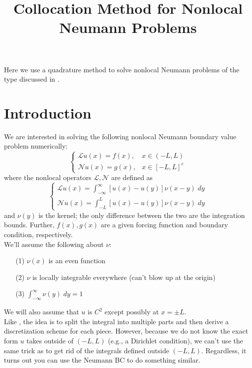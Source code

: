 \documentclass[pra,onecolumn,superscriptaddress,aps]{revtex4}
\begin{document}
\title{Collocation Method for Nonlocal Neumann Problems}


\maketitle
       
Here we use a quadrature method to solve nonlocal Neumann problems of the type discussed in \cite{Ros-Oton}. 

\section{Introduction}  
We are interested in solving the following nonlocal Neumann boundary value problem numerically:
\begin{equation}
\begin{cases}
\mathcal{L}u(x) = f(x), & x \in (-L, L) \\
\mathcal{N}u(x) = g(x), & x \in [-L,L]^c
\end{cases}
\end{equation}
where the nonlocal operators $\mathcal{L}, \mathcal{N}$ are defined as
\begin{equation} 
\begin{cases}
\mathcal{L}u(x) = \int^\infty_{-\infty} [u(x) - u(y)] \nu(x-y) \; dy\\[.2cm]
\mathcal{N}u(x) = \int^L_{-L} [u(x) - u(y)] \nu(x-y) \; dy 
\end{cases}
\label{eq2}
\end{equation}
and $\nu(y)$ is the kernel; the only difference between the two are the integration bounds. Further, $f(x), g(x)$ are a given forcing function and boundary condition, respectively. \\

We'll assume the following about $\nu$:
\begin{itemize}
\item[(1)] $\nu(x)$ is an even function
\item[(2)] $\nu$ is locally integrable everywhere (can't blow up at the origin)
\item[(3)] $\int^\infty_{-\infty} \nu(y) \; dy = 1$
\end{itemize}

We will also assume that $u$ is $C^2$ except possibly at $x = \pm L$.\\

Like \cite{Oberman}, the idea is to split the integral into multiple parts and then derive a discretization scheme for each piece. However, because we do not know the exact form $u$ takes outside of $(-L,L)$ (e.g., a Dirichlet condition), we can't use the same trick as \cite{Oberman} to get rid of the integrals defined outside $(-L,L)$. Regardless, it turns out you can use the Neumann BC to do something similar.\\
\end{document}
